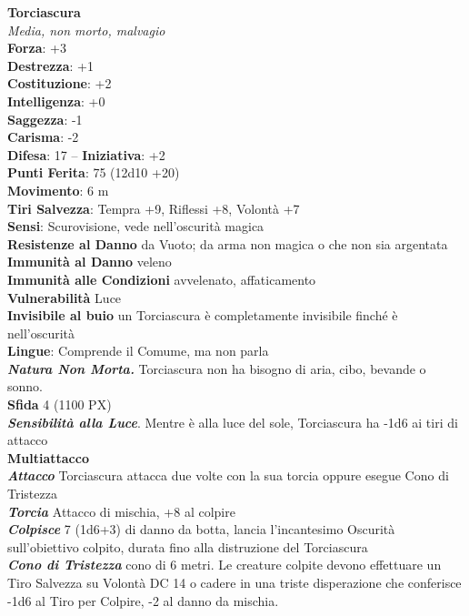 \begin{multicols}{2}
\medskip\textbf{Torciascura}\\
\textit{Media, non morto, malvagio}\\
\textbf{Forza}: +3\\
\textbf{Destrezza}: +1\\
\textbf{Costituzione}: +2\\
\textbf{Intelligenza}: +0\\
\textbf{Saggezza}: -1\\
\textbf{Carisma}: -2\\
\textbf{Difesa}: 17 -- \textbf{Iniziativa}: +2\\
\textbf{Punti Ferita}: 75 (12d10 +20)\\
\textbf{Movimento}: 6 m\\
\textbf{Tiri Salvezza}: Tempra +9, Riflessi +8, Volontà +7 \\
\textbf{Sensi}: Scurovisione, vede nell'oscurità magica\\
\textbf{Resistenze al Danno} da Vuoto; da arma non magica o che non sia argentata\\
\textbf{Immunità al Danno} veleno\\
\textbf{Immunità alle Condizioni} avvelenato, affaticamento\\
\textbf{Vulnerabilità} Luce\\
\textbf{Invisibile al buio} un Torciascura è completamente invisibile finché è nell'oscurità\\
\textbf{Lingue}: Comprende il Comume, ma non parla\\
\textit{\textbf{Natura Non Morta.}} Torciascura non ha bisogno di aria, cibo, bevande o sonno.\\
\textbf{Sfida} 4 (1100 PX)\\
\textit{\textbf{Sensibilità alla Luce}}. Mentre è alla luce del sole, Torciascura ha -1d6 ai tiri di attacco\\
\textbf{Multiattacco}\\
\textit{\textbf{Attacco}} Torciascura attacca due volte con la sua torcia oppure esegue Cono di Tristezza\\
\textit{\textbf{Torcia}} Attacco di mischia, +8 al colpire\\
\textit{\textbf{Colpisce}} 7 (1d6+3) di danno da botta, lancia l'incantesimo Oscurità sull'obiettivo colpito, durata fino alla distruzione del Torciascura\\
\textit{\textbf{Cono di Tristezza}} cono di 6 metri. Le creature colpite devono effettuare un Tiro Salvezza su Volontà DC 14 o cadere in una triste disperazione che conferisce -1d6 al Tiro per Colpire, -2 al danno da mischia.\\

\end{multicols}

